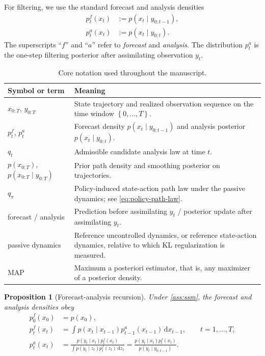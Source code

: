 \documentclass[11pt]{article}
\newcommand{\dd}{\,\mathrm d}
\newcommand{\xtraj}{x_{0:T}}
\newcommand{\ytraj}{y_{0:T}}
\newcommand{\qpi}{q_\pi}
\newcommand{\set}[1]{\left\{ #1 \right\}}
\numberwithin{equation}{section}
\theoremstyle{plain}
\newtheorem{proposition}[theorem]{Proposition}
\theoremstyle{definition}
\theoremstyle{remark}
\begin{document}
For filtering, we use the standard forecast and analysis densities
\begin{align}
p_t^f(x_t) &:= p(x_t\mid y_{0:t-1}), \label{eq:forecast-density}\\
p_t^a(x_t) &:= p(x_t\mid y_{0:t}). \label{eq:analysis-density}
\end{align}
The superscripts ``$f$'' and ``$a$'' refer to \emph{forecast} and \emph{analysis}. The distribution $p_t^a$ is the one-step filtering posterior after assimilating observation $y_t$.

\begin{table}[t]
\centering
\caption{Core notation used throughout the manuscript.}
\label{tab:notation}
\begin{tabularx}{\textwidth}{@{}>{\raggedright\arraybackslash}p{}X@{}}
\toprule
Symbol or term & Meaning \\
\midrule
$\xtraj$, $\ytraj$ & State trajectory and realized observation sequence on the time window $\set{0,\dots,T}$. \\
$p_t^f$, $p_t^a$ & Forecast density $p(x_t\mid y_{0:t-1})$ and analysis posterior $p(x_t\mid y_{0:t})$. \\
$q_t$ & Admissible candidate analysis law at time $t$. \\
$p(\xtraj)$, $p(\xtraj\mid \ytraj)$ & Prior path density and smoothing posterior on trajectories. \\
$\qpi$ & Policy-induced state-action path law under the passive dynamics; see \cref{eq:policy-path-law}. \\
forecast / analysis & Prediction before assimilating $y_t$ / posterior update after assimilating $y_t$. \\
passive dynamics & Reference uncontrolled dynamics, or reference state-action dynamics, relative to which KL regularization is measured. \\
MAP & Maximum a posteriori estimator, that is, any maximizer of a posterior density. \\
\bottomrule
\end{tabularx}
\end{table}

\begin{proposition}[Forecast-analysis recursion]
\label{prop:forecast-analysis}
Under \cref{ass:ssm}, the forecast and analysis densities obey
\begin{align}
p_0^f(x_0)
&=
p(x_0), \label{eq:forecast-initial}\\
p_t^f(x_t)
&=
\int p(x_t\mid x_{t-1})p_{t-1}^a(x_{t-1})\dd x_{t-1},
\qquad t=1,\dots,T,
\label{eq:forecast-recursion}\\
p_t^a(x_t)
&=
\frac{p(y_t\mid x_t)p_t^f(x_t)}{\int p(y_t\mid z_t)p_t^f(z_t)\dd z_t}
=
\frac{p(y_t\mid x_t)p_t^f(x_t)}{p(y_t\mid y_{0:t-1})}.
\label{eq:analysis-recursion}
\end{align}
\end{proposition}
\end{document}
